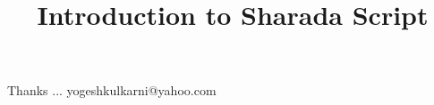\documentclass[xcolor=dvipsnames,compress,t,pdf,9pt]{beamer}
\title[\insertframenumber /\inserttotalframenumber]{Introduction to Sharada Script}
\begin{document}
	\begin{frame}
	\titlepage
	\end{frame}
	
	
	
	\begin{frame}[c]{}
	Thanks ...
	\vspace{5mm}
	yogeshkulkarni@yahoo.com
	\end{frame}
\end{document}
